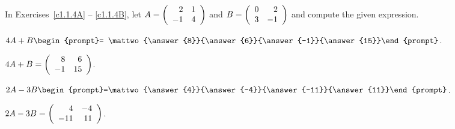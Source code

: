 \documentclass{ximera}
\begin{document}
\noindent In Exercises~\ref{c1.1.4A} -- \ref{c1.1.4B}, let
$A=\left(\begin{array}{rr} 2 & 1\\ -1 &4\end{array}\right)$ and $B=\left(\begin{array}{rr} 0 & 2\\ 3 &-1\end{array}\right)$ and compute the given 
expression.
\begin{exercise}\label{c1.1.4A}
  $4A+B\begin{prompt}= \mattwo{\answer{8}}{\answer{6}}{\answer{-1}}{\answer{15}}\end{prompt}$.

\begin{solution}
$4A + B = \left(\begin{array}{rr} 8 & 6\\ -1 &15\end{array}\right)$.


\end{solution}
\end{exercise}
\begin{exercise}\label{c1.1.4B}
  $2A-3B\begin{prompt}=\mattwo{\answer{4}}{\answer{-4}}{\answer{-11}}{\answer{11}}\end{prompt}$.

\begin{solution}
$2A - 3B = \left(\begin{array}{rr} 4 & -4\\ -11 &11\end{array}\right)$.




\end{solution}
\end{exercise}
\end{document}
